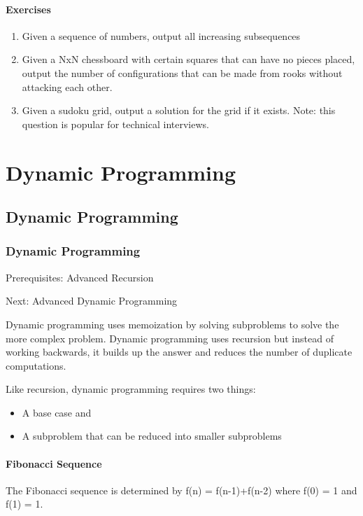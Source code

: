 \documentclass[11pt,oneside]{book}
\begin{document}
\subsection{Exercises}

\begin{enumerate}
\item Given a sequence of numbers, output all increasing subsequences
\item Given a NxN chessboard with certain squares that can have no pieces placed, output the number of configurations that can be made from rooks without attacking each other.
\item Given a sudoku grid, output a solution for the grid if it exists. Note: this question is popular for technical interviews.
\end{enumerate}

\part{ Dynamic Programming }
    \chapter{ Dynamic Programming }
        \section{ Dynamic Programming }
        

Prerequisites: Advanced Recursion

Next: Advanced Dynamic Programming

Dynamic programming uses memoization by solving subproblems to solve the more complex problem. Dynamic programming uses recursion but instead of working backwards, it builds up the answer and reduces the number of duplicate computations.

Like recursion, dynamic programming requires two things:

\begin{itemize}
\item A base case and
\item A subproblem that can be reduced into smaller subproblems 
\end{itemize}

\subsection{Fibonacci Sequence}

The Fibonacci sequence is determined by f(n) = f(n-1)+f(n-2) where f(0) = 1 and f(1) = 1.
\end{document}
